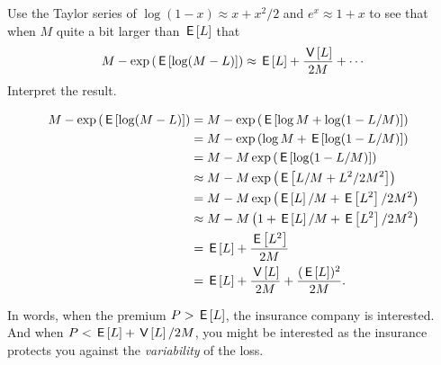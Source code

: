 \documentclass[lectures]{subfiles}
\begin{document}
\begin{exercise}
Use the Taylor series of $\log (1-x) \approx x + x^{2}/2$ and $e^{x} \approx 1+x $  to see that when $M$ quite a bit larger than $\,\mathsf{E}\left[L\right]$ that
\begin{equation}
  \label{eq:137}
M - \exp\left(\,\mathsf{E}\left[\log (M-L)\right]\right) \approx \,\mathsf{E}\left[L\right] + \frac{\,\mathsf{V}\left[L\right]}{2 M} + \cdots
\end{equation}
Interpret the result.
\begin{solution}
  \begin{align}
M - \exp\left(\,\mathsf{E}\left[\log (M-L)\right]\right)
&=  M - \exp\left(\,\mathsf{E}\left[\log M + \log (1-L/M)\right]\right)  \\
&=  M - \exp\left(\log M + \,\mathsf{E}\left[\log (1-L/M)\right]\right)  \\
&=  M - M \exp\left(\,\mathsf{E}\left[\log (1-L/M)\right]\right)  \\
&\approx  M - M \exp\left(\,\mathsf{E}\left[ L/M + L^{2}/2M^{2}\right]\right)  \\
&=  M - M \exp\left(\,\mathsf{E}\left[L\right]/M + \,\mathsf{E}\left[L^{2}\right]/2M^{2}\right)  \\
&\approx  M - M \left(1+ \,\mathsf{E}\left[L\right]/M + \,\mathsf{E}\left[L^{2}\right]/2M^{2}\right)  \\
&= \,\mathsf{E}\left[L\right]  + \frac{\,\mathsf{E}\left[L^{2}\right]}{2M} \\
&= \,\mathsf{E}\left[L\right] + \frac{\,\mathsf{V}\left[L\right]}{2M} + \frac{(\,\mathsf{E}\left[L\right])^{2}}{2M}.
  \end{align}

  In words, when the premium $P>\,\mathsf{E}\left[L\right]$, the insurance company is interested.
  And when $P< \,\mathsf{E}\left[L\right] + \,\mathsf{V}\left[L\right]/2M$, you might be interested as the insurance protects you against the \emph{variability} of the loss.

\end{solution}
\end{exercise}
\end{document}
